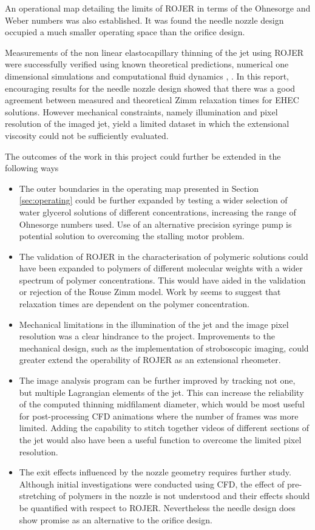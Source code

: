 \documentclass[11pt]{article}
\begin{document}
An operational map detailing the limits of ROJER in terms of the Ohnesorge and 
Weber numbers was also established. It was found the needle nozzle design 
occupied a much smaller operating space than the orifice design.

Measurements of the non linear elastocapillary thinning of the jet using ROJER 
were successfully verified using known theoretical predictions, numerical one 
dimensional simulations \citep{hall2015report} and computational fluid dynamics 
\citep{gorbatenko2015report}, \citep{greiciunas2015report}. In this report, 
encouraging results for the needle nozzle design showed that there was a good 
agreement between measured and theoretical Zimm relaxation times for EHEC 
solutions. However mechanical constraints, namely illumination and pixel 
resolution of the imaged jet, yield a limited dataset in which the extensional 
viscosity could not be sufficiently evaluated.

The outcomes of the work in this project could further be extended in the 
following ways
\begin{itemize}
	\item The outer boundaries in the operating map presented in Section 
\ref{sec:operating} could be further expanded by testing a wider selection of 
water glycerol solutions of different concentrations, increasing the range of 
Ohnesorge numbers used. Use of an alternative precision syringe pump is 
potential solution to overcoming the stalling motor problem.
	\item The validation of ROJER in the characterisation of polymeric 
solutions could have been expanded to polymers of different molecular weights 
with a wider spectrum of polymer concentrations. This would have aided in the 
validation or rejection of the Rouse Zimm model. Work by 
\cite{clasen2006dilute} seems to suggest that relaxation times are dependent on 
the polymer concentration.
	\item Mechanical limitations in the illumination of the jet and the image 
pixel resolution was a clear hindrance to the project. Improvements to the 
mechanical design, such as the implementation of stroboscopic imaging, could 
greater extend the operability of ROJER  as an extensional rheometer.
	\item The image analysis program can be further improved by tracking not 
one, but multiple Lagrangian elements of the jet. This can increase the 
reliability of the computed thinning midfilament diameter, which would be most 
useful for post-processing CFD animations where the number of frames was more 
limited. Adding the capability to stitch together videos of different sections 
of the jet would also have been a useful function to overcome the limited pixel 
resolution.
	\item The exit effects influenced by the nozzle geometry requires further 
study. Although initial investigations were conducted using CFD, the effect of 
pre-stretching of polymers in the nozzle is not understood and their effects 
should be quantified with respect to ROJER. Nevertheless the needle design does 
show promise as an alternative to the orifice design.
\end{itemize}
\end{document}
